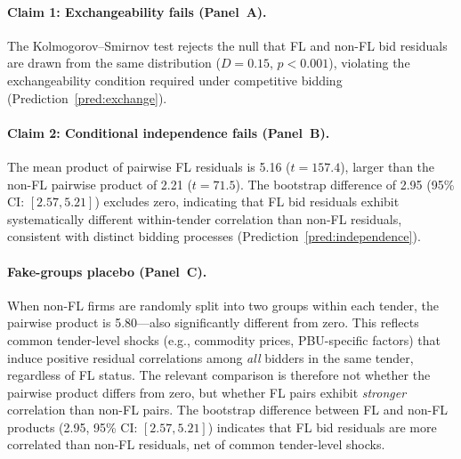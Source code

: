 \paragraph{Claim 1: Exchangeability fails (Panel~A).}
The Kolmogorov--Smirnov test rejects the null that FL and
non-FL bid residuals are drawn from the same distribution
($D = 0.15$, $p < 0.001$), violating the exchangeability condition
required under competitive bidding (Prediction~\ref{pred:exchange}).

\paragraph{Claim 2: Conditional independence fails (Panel~B).}
The mean product of pairwise FL residuals is 5.16 ($t = 157.4$),
larger than the non-FL pairwise product of 2.21 ($t = 71.5$). The
bootstrap difference of 2.95 (95\% CI: $[2.57, 5.21]$) excludes zero,
indicating that FL bid residuals exhibit systematically different %
within-tender correlation than non-FL residuals, consistent with
distinct bidding processes (Prediction~\ref{pred:independence}).

\paragraph{Fake-groups placebo (Panel~C).}
When non-FL firms are randomly split into two groups within each tender,
the pairwise product is 5.80---also significantly different from zero.
This reflects common tender-level shocks (e.g., commodity prices,
PBU-specific factors) that induce positive residual correlations among
\emph{all} bidders in the same tender, regardless of FL status. The
relevant comparison is therefore not whether the pairwise product differs
from zero, but whether FL pairs exhibit \emph{stronger} correlation than
non-FL pairs. The bootstrap difference between FL and non-FL products
(2.95, 95\% CI: $[2.57, 5.21]$) indicates that FL bid residuals are
more correlated than non-FL residuals, net of common tender-level shocks.

